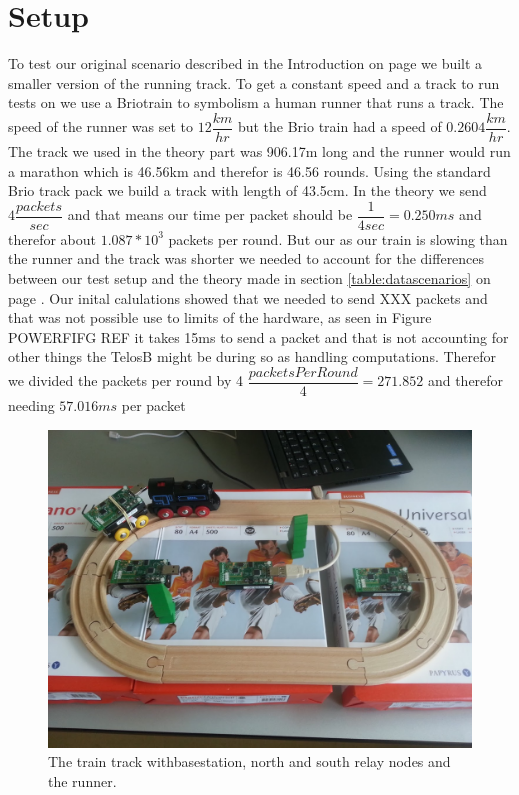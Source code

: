 \section{Setup}\label{sc:setup}
To test our original scenario described in the Introduction on page \pageref{ch:introduction} we built a smaller version of the running track. To get a constant speed and a track to run tests on we use a Brio\texttrademark train to symbolism a human runner that runs a track. The speed of the runner was set to $12\dfrac{km}{hr}$ but the Brio train had a speed of $0.2604\dfrac{km}{hr}$. The track we used in the theory part was 906.17m long and the runner would run a marathon which is 46.56km and therefor is 46.56 rounds. Using the standard Brio track pack we build a track with length of 43.5cm. In the theory we send $4\dfrac{packets}{sec}$ and that means our time per packet should be $\dfrac{1}{4sec} = 0.250ms$ and therefor about $ 1.087*10^3$ packets per round. But our as our train is slowing than the runner and the track was shorter we needed to account for the differences between our test setup and the theory made in section \ref{table:datascenarios} on page \pageref{table:scenarios}. Our inital calulations showed that we needed to send XXX packets and that was not possible use to limits of the hardware, as seen in Figure POWERFIFG REF it takes 15ms to send a packet and that is not accounting for other things the TelosB might be during so as handling computations. Therefor we divided the packets per round by 4 $ \dfrac{packetsPerRound}{4} = 271.852 $ and therefor needing $57.016 ms$ per packet



\begin{figure}[H]
	\centering
	\includegraphics[width=1\linewidth]{testAndPerformance/setup/setup}
	\caption{The train track withbasestation, north and south relay nodes and the runner. }
	\label{fig:testSetup}
\end{figure}

